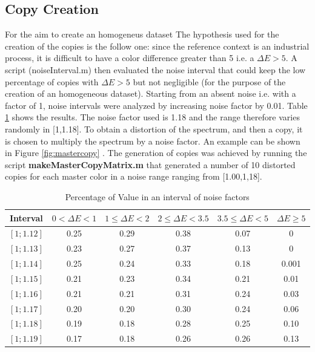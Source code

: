 \documentclass{article}
\begin{document}
\subsection{Copy Creation} 
For the aim to create an homogeneus dataset
The hypothesis used for the creation of the copies is the follow one: since the reference context is an industrial process, it is difficult to have a color difference greater than 5 i.e. a $\Delta E>5$. A script (noiseInterval.m) then evaluated the noise interval that could keep the low percentage of copies with $\Delta E>5$ but not negligible (for the purpose of the creation of an homogeneous dataset). Starting from an absent noise i.e. with a factor of 1, noise intervals were analyzed by increasing noise factor by 0.01. Table \ref{tab:tablepercentage} shows the results. The noise factor used is 1.18 and the range therefore varies randomly in [1,1.18]. To obtain a distortion of the spectrum, and then a copy, it is chosen to multiply the spectrum by a noise factor. An example can be shown in Figure \ref{fig:mastercopy} . The generation of copies was achieved by running the script \textbf{makeMasterCopyMatrix.m} that generated a number of 10 distorted copies for each master color in a noise range ranging from [1.00,1,18].
\begin{table}[h!]
  \begin{center}
    \label{tab:tablepercentage}
    \begin{tabular}{c|c|c|c|c|c} 
      \textbf{Interval} & \textbf{$0<\Delta E<1$} & \textbf{$1\leq\Delta E<2$}&\textbf{$2\leq\Delta E<3.5$}&\textbf{$3.5\leq\Delta E<5$}&\textbf{$\Delta E\geq5$}\\
       \hline
      $[1;1.12]$ & 0.25	 &0.29	&0.38	&0.07	& 0\\
      $[1;1.13]$ & 0.23 &	0.27 &	0.37 &	0.13 & 	0\\
      $[1;1.14]$ & 0.25 & 0.24 & 	0.33 &	0.18 &	0.001\\
      $[1;1.15]$ & 0.21 &	0.23 &	0.34 &	0.21 &	0.01\\
      $[1;1.16]$ & 0.21 &	0.21 &	0.31 &	0.24 &	0.03\\
      $[1;1.17]$ & 0.20 &	0.20 &	0.30 &	0.24 &	0.06\\
      $[1;1.18]$ & 0.19 &	0.18 &	0.28 &	0.25 &	0.10\\
      $[1;1.19]$ & 0.17 &	0.18 &	0.26 &	0.26 &	0.13\\
    \end{tabular}
    \caption{Percentage of Value in an interval of noise factors}
  \end{center}
\end{table}
\end{document}
